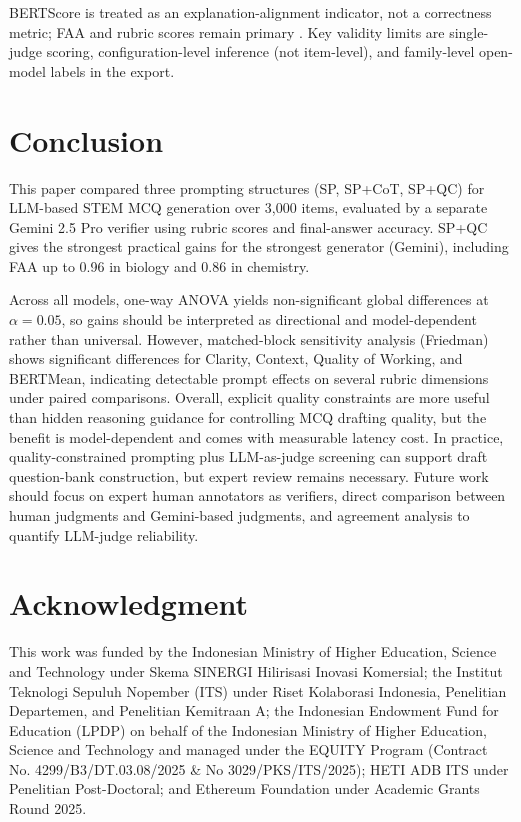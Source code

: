 ﻿\documentclass[a4paper,conference,10pt]{IEEEtran}
\begin{document}
BERTScore is treated as an explanation-alignment indicator, not a correctness metric; FAA and rubric scores remain primary \cite{hanna2021finegrained}. Key validity limits are single-judge scoring, configuration-level inference (not item-level), and family-level open-model labels in the export.
\section{Conclusion}

This paper compared three prompting structures (SP, SP+CoT, SP+QC) for LLM-based STEM MCQ generation over 3{,}000 items, evaluated by a separate Gemini 2.5 Pro verifier using rubric scores and final-answer accuracy. SP+QC gives the strongest practical gains for the strongest generator (Gemini), including FAA up to 0.96 in biology and 0.86 in chemistry.

Across all models, one-way ANOVA yields non-significant global differences at \(\alpha=0.05\), so gains should be interpreted as directional and model-dependent rather than universal. However, matched-block sensitivity analysis (Friedman) shows significant differences for Clarity, Context, Quality of Working, and BERTMean, indicating detectable prompt effects on several rubric dimensions under paired comparisons. Overall, explicit quality constraints are more useful than hidden reasoning guidance for controlling MCQ drafting quality, but the benefit is model-dependent and comes with measurable latency cost. In practice, quality-constrained prompting plus LLM-as-judge screening can support draft question-bank construction, but expert review remains necessary. Future work should focus on expert human annotators as verifiers, direct comparison between human judgments and Gemini-based judgments, and agreement analysis to quantify LLM-judge reliability.

\section*{Acknowledgment}

This work was funded by the Indonesian Ministry of Higher Education, Science and Technology under Skema SINERGI Hilirisasi Inovasi Komersial; the Institut Teknologi Sepuluh Nopember (ITS) under Riset Kolaborasi Indonesia, Penelitian Departemen, and Penelitian Kemitraan A; the Indonesian Endowment Fund for Education (LPDP) on behalf of the Indonesian Ministry of Higher Education, Science and Technology and managed under the EQUITY Program (Contract No. 4299/B3/DT.03.08/2025 \& No 3029/PKS/ITS/2025); HETI ADB ITS under Penelitian Post-Doctoral; and Ethereum Foundation under Academic Grants Round 2025.

\enlargethispage{2\baselineskip}


\end{document}
